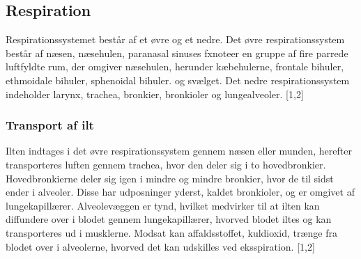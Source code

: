 \subsection{Respiration}
Respirationssystemet består af et øvre og et nedre. Det øvre respirationssystem består af næsen, næsehulen, paranasal sinuses fxnote{er en gruppe af fire parrede luftfyldte rum, der omgiver næsehulen, herunder kæbehulerne, frontale bihuler, ethmoidale bihuler, sphenoidal bihuler.} og svælget. Det nedre respirationssystem indeholder larynx, trachea, bronkier, bronkioler og lungealveoler. [1,2]

\subsubsection{Transport af ilt} 
Ilten indtages i det øvre respirationssystem gennem næsen eller munden, herefter transporteres luften gennem trachea, hvor den deler sig i to hovedbronkier. Hovedbronkierne deler sig igen i mindre og mindre bronkier, hvor de til sidst ender i alveoler. Disse har udposninger yderst, kaldet bronkioler, og er omgivet af lungekapillærer.  Alveolevæggen er tynd, hvilket medvirker til at ilten kan diffundere over i blodet gennem lungekapillærer, hvorved blodet iltes og kan transporteres ud i musklerne. Modsat kan affaldsstoffet, kuldioxid, trænge fra blodet over i alveolerne, hvorved det kan udskilles ved eksspiration. [1,2]
